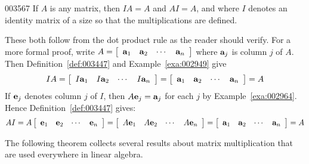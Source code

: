 \begin{example}{}{003567}
If $A$ is any matrix, then $IA = A$ and $AI = A$, and where $I$ denotes an identity matrix of a size so that the multiplications are defined.


\begin{solution}
  These both follow from the dot product rule as the reader should verify. For a more formal proof, write $A = \left[ \begin{array}{rrrr}
\textbf{a}_{1} & \textbf{a}_{2} & \cdots & \textbf{a}_{n}
\end{array} \right]$ where $\textbf{a}_{j}$ is column $j$ of $A$. Then Definition~\ref{def:003447} and Example~\ref{exa:002949} give
\begin{equation*}
IA = \left[ \begin{array}{rrrr}
I\textbf{a}_{1} & I\textbf{a}_{2} & \cdots & I\textbf{a}_{n}
\end{array} \right] = \left[ \begin{array}{rrrr}
\textbf{a}_{1} & \textbf{a}_{2} & \cdots & \textbf{a}_{n}
\end{array} \right] = A
\end{equation*}
If $\textbf{e}_{j}$ denotes column $j$ of $I$, then $A\textbf{e}_{j} = \textbf{a}_{j}$ for each $j$ by Example~\ref{exa:002964}. Hence Definition~\ref{def:003447} gives:
\begin{equation*}
AI = A \left[ \begin{array}{rrrr}
\textbf{e}_{1} & \textbf{e}_{2} & \cdots & \textbf{e}_{n}
\end{array} \right] = \left[ \begin{array}{rrrr}
A\textbf{e}_{1} & A\textbf{e}_{2} & \cdots & A\textbf{e}_{n}
\end{array} \right] = \left[ \begin{array}{rrrr}
\textbf{a}_{1} & \textbf{a}_{2} & \cdots & \textbf{a}_{n}
\end{array} \right] = A
\end{equation*}
\end{solution}
\end{example}

The following theorem collects several results about matrix multiplication that are used everywhere in linear algebra.

